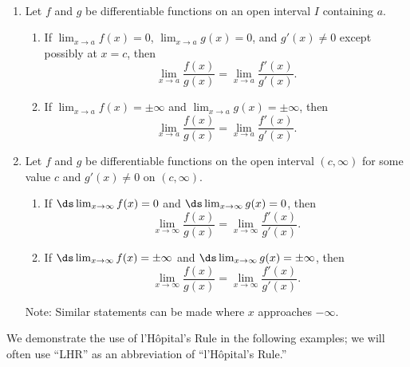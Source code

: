 {\mbox{}\\[-2\baselineskip]\begin{enumerate}
\item Let $f$ and $g$ be differentiable functions on an open interval $I$ containing $a$.
\begin{enumerate}
\item If $\displaystyle\lim_{x\to a}f(x)=0$, $\displaystyle\lim_{x\to a}g(x)=0$, and $g'(x)\neq 0$ except possibly at $x=c$, then \[\lim_{x\to a}\frac{f(x)}{g(x)}=\lim_{x\to a} \frac{f'(x)}{g'(x)}.\]
\item If  $\displaystyle\lim_{x\to a}f(x)=\pm\infty$ and $\displaystyle\lim_{x\to a}g(x)=\pm\infty$, then \[\lim_{x\to a}\frac{f(x)}{g(x)}=\lim_{x\to a} \frac{f'(x)}{g'(x)}.\]
\end{enumerate}
\item Let $f$ and $g$ be differentiable functions on the open interval $(c,\infty)$ for some value $c$ and $g'(x)\neq0$ on $(c,\infty)$.
\begin{enumerate}
\item If $\ds\lim_{x\to\infty}f(x)=0$ and $\ds\lim_{x\to \infty}g(x)=0$, then
\[\lim_{x\to\infty}\frac{f(x)}{g(x)}=\lim_{x\to\infty} \frac{f'(x)}{g'(x)}.\]
\item If  $\ds\lim_{x\to \infty}f(x)=\pm\infty$ and $\ds\lim_{x\to \infty}g(x)=\pm\infty$, then
\[\lim_{x\to\infty}\frac{f(x)}{g(x)}=\lim_{x\to\infty}\frac{f'(x)}{g'(x)}.\]
\end{enumerate}
Note:  Similar statements can be made where $x$ approaches $-\infty$.
\end{enumerate}}

We demonstrate the use of l'H\^opital's Rule in the following examples; we will often use ``LHR'' as an abbreviation of ``l'H\^opital's Rule.''

